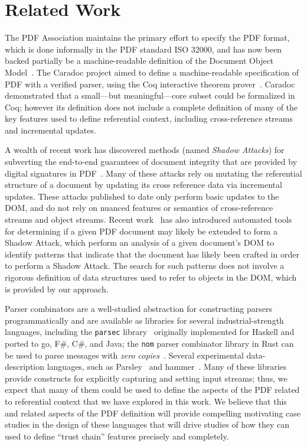 \section{Related Work}
\label{sec:rel-work}

The PDF Association maintains the primary effort to specify the PDF
format, which is done informally in the PDF standard ISO 32000, and has now
been backed partially be a machine-readable definition of the Document
Object Model~\cite{peterwyattArlingtonPDFModel2021}.
%
The Caradoc project aimed to define a machine-readable specification
of PDF with a verified parser, using the Coq interactive theorem
prover~\cite{g.endignouxCaradocPragmaticApproach2016}.
%
Caradoc demonstrated that a small---but meaningful---core subset could
be formalized in Coq;
%
however its definition does not include a complete definition of many
of the key features used to define referential context, including
cross-reference streams and incremental updates.

A wealth of recent work has discovered methods (named \emph{Shadow
Attacks}) for subverting the end-to-end guarantees of document
integrity that are provided by digital signatures in
PDF~\cite{mullerPracticalDecryptionExFiltration2019,mladenovTrillionDollarRefund2019,mullerProcessingDangerousPaths2021,ndsssymposiumNDSS2021Shadow2021,rohlmannBreakingSpecificationPDF2021}.
%
Many of these attacks rely on mutating the referential structure of a
document by updating its cross reference data via incremental
updates.
%
These attacks published to date only perform basic
updates to the DOM, and do not rely on nuanced features or semantics
of cross-reference streams and object streams.
%
Recent work~\cite{itextShadowAttack} has also introduced automated
tools for determining if a given PDF document may likely be extended
to form a Shadow Attack, which perform an analysis of a given
document's DOM to identify patterns that indicate that the document
has likely been crafted in order to perform a Shadow Attack.
%
The search for such patterns does not involve a rigorous definition of
data structures used to refer to objects in the DOM, which is provided
by our approach.

Parser combinators are a well-studied abstraction for constructing
parsers programmatically and are available as libraries for several
industrial-strength languages, including the \texttt{parsec}
library~\cite{leijen2001parsec} originally implemented for Haskell and
ported to go, F\#, C\#, and Java;
%
the \texttt{nom} parser combinator library in Rust can be used to
parse messages with \emph{zero copies}~\cite{couprie2015nom}.
%
Several experimental data-description languages, such as
Parsley~\cite{mundkurResearchReportParsley2020} and
hammer~\cite{bratus2017curing}.
%
Many of these libraries provide constructs for explicitly capturing
and setting input streams;
%
thus, we expect that many of them could be used to define the aspects
of the PDF related to referential context that we have explored in
this work.
%
We believe that this and related aspects of the PDF definition will
provide compelling motivating case studies in the design of these
languages that will drive studies of how they can used to define ``trust chain''
features precisely and completely.
